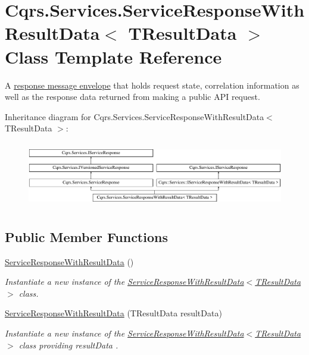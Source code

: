 \hypertarget{classCqrs_1_1Services_1_1ServiceResponseWithResultData}{}\section{Cqrs.\+Services.\+Service\+Response\+With\+Result\+Data$<$ T\+Result\+Data $>$ Class Template Reference}
\label{classCqrs_1_1Services_1_1ServiceResponseWithResultData}


A \hyperlink{interfaceCqrs_1_1Services_1_1IServiceResponse}{response message envelope} that holds request state, correlation information as well as the response data returned from making a public A\+PI request.  


Inheritance diagram for Cqrs.\+Services.\+Service\+Response\+With\+Result\+Data$<$ T\+Result\+Data $>$\+:\begin{figure}[H]
\begin{center}
\leavevmode
\includegraphics[height=2.909091cm]{classCqrs_1_1Services_1_1ServiceResponseWithResultData}
\end{center}
\end{figure}
\subsection*{Public Member Functions}
\begin{DoxyCompactItemize}
\item 
\hyperlink{classCqrs_1_1Services_1_1ServiceResponseWithResultData_a4241511df21804b73baec2b0c2e66402_a4241511df21804b73baec2b0c2e66402}{Service\+Response\+With\+Result\+Data} ()
\begin{DoxyCompactList}\small\item\em Instantiate a new instance of the \hyperlink{classCqrs_1_1Services_1_1ServiceResponseWithResultData_a4241511df21804b73baec2b0c2e66402_a4241511df21804b73baec2b0c2e66402}{Service\+Response\+With\+Result\+Data$<$\+T\+Result\+Data$>$} class. \end{DoxyCompactList}\item 
\hyperlink{classCqrs_1_1Services_1_1ServiceResponseWithResultData_a63a840d449e8b06652130ffb1228432d_a63a840d449e8b06652130ffb1228432d}{Service\+Response\+With\+Result\+Data} (T\+Result\+Data result\+Data)
\begin{DoxyCompactList}\small\item\em Instantiate a new instance of the \hyperlink{classCqrs_1_1Services_1_1ServiceResponseWithResultData_a4241511df21804b73baec2b0c2e66402_a4241511df21804b73baec2b0c2e66402}{Service\+Response\+With\+Result\+Data$<$\+T\+Result\+Data$>$} class providing {\itshape result\+Data} . \end{DoxyCompactList}\end{DoxyCompactItemize}

